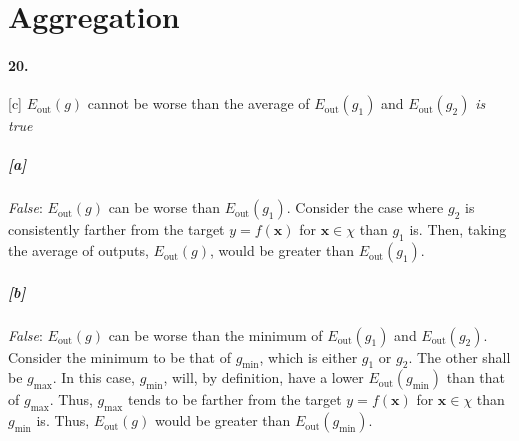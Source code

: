 \documentclass[titlepage]{article}
\begin{document}
\section*{Aggregation}
\paragraph{20.} [c] $E_{\text{out}}(g)$ cannot be worse than the average of $E_{\text{out}}(g_1)$ and $E_{\text{out}}(g_2)$ \textit{is true} 

	\subparagraph{[a]} \textit{False}: $E_{\text{out}}(g)$ can be worse than $E_{\text{out}}(g_1)$. Consider the case where $g_2$ is consistently farther from the target $y = f(\bm x)$ for $\bm x \in \chi$ than $g_1$ is. Then, taking the average of outputs, $E_{\text{out}}(g)$, would be greater than $E_{\text{out}}(g_1)$.

	\subparagraph{[b]} \textit{False}: $E_{\text{out}}(g)$ can be worse than the minimum of $E_{\text{out}}(g_1)$ and $E_{\text{out}}(g_2)$. Consider the minimum to be that of $g_{\text{min}}$, which is either $g_1$ or $g_2$. The other shall be $g_{\text{max}}$. In this case, $g_{\text{min}}$, will, by definition, have a lower $E_{\text{out}}(g_{\text{min}})$ than that of $g_{\text{max}}$. Thus, $g_{\text{max}}$ tends to be farther from the target $y = f(\bm x)$ for $\bm x \in \chi$ than $g_{\text{min}}$ is. Thus, $E_{\text{out}}(g)$ would be greater than $E_{\text{out}}(g_{\text{min}})$.
	
\end{document}
